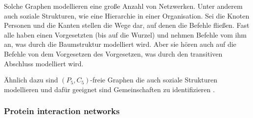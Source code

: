 \documentclass[12pt,a4paper,onecolumn,oneside,titlepage]{article}
\begin{document}
Solche Graphen modellieren eine große Anzahl von Netzwerken. Unter anderem auch soziale Strukturen, wie eine Hierarchie in einer Organisation. Sei die Knoten Personen und die Kanten stellen die Wege dar, auf denen die Befehle fließen. Fast alle haben einen Vorgesetzten (bis auf die Wurzel) und nehmen Befehle vom ihm an, was durch die Baumstruktur modelliert wird. Aber sie hören auch auf die Befehle von dem Vorgesetzen des Vorgesetzen, was durch den transitiven Abschluss modelliert wird\cite{NastosG13}. 

Ähnlich dazu sind $(P_5,C_5)$-freie Graphen die auch soziale Strukturen modellieren und dafür geeignet sind Gemeinschaften zu identifizieren \cite{Schoch15}. 

\subsubsection{Protein interaction networks}
\end{document}
